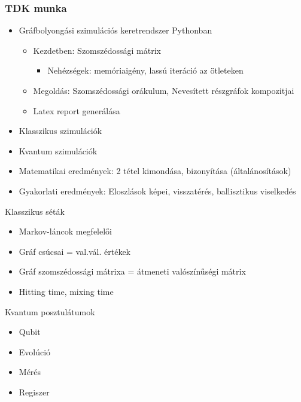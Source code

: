 \documentclass[aspectratio=169]{beamer}
\begin{document}
\begin{frame}
  \frametitle{TDK munka}
  \begin{itemize}
    \item Gráfbolyongási szimulációs keretrendszer Pythonban
    \begin{itemize}
      \item Kezdetben: Szomszédossági mátrix
      \begin{itemize}
        \item Nehézségek: memóriaigény, lassú iteráció az ötleteken
      \end{itemize}
      \item Megoldás: Szomszédossági orákulum, Nevesített részgráfok kompozitjai
      \item Latex report generálása
    \end{itemize}
    \item Klasszikus szimulációk
    \item Kvantum szimulációk
    \item Matematikai eredmények: 2 tétel kimondása, bizonyítása (általánosítások)
    \item Gyakorlati eredmények: Eloszlások képei, visszatérés, ballisztikus viselkedés
  \end{itemize}
\end{frame}

\begin{frame}{Klasszikus séták}
    \begin{itemize}
        \item Markov-láncok megfelelői
        \item Gráf csúcsai = val.vál. értékek
        \item Gráf szomszédossági mátrixa = átmeneti valószínűségi mátrix
        \item Hitting time, mixing time
    \end{itemize}
\end{frame}

\begin{frame}{Kvantum posztulátumok}
\begin{itemize}
\item Qubit
\item Evolúció
\item Mérés
\item Regiszer
\end{itemize}
\end{frame}
\end{document}
